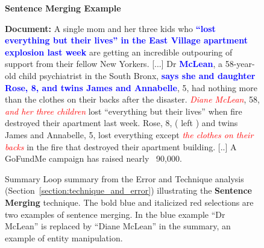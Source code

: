\documentclass[11pt,a4paper]{article}
\begin{document}
\begin{figure*}[!htbp]
    \begin{framed}
        \begin{center}
            \large
            \textbf{Sentence Merging Example}
        \end{center}
        
        \textbf{Document:} 
        A single mom and her three kids who \textbf{\textcolor{blue}{``lost everything but their lives'' in the East Village apartment explosion last week}} are getting an incredible outpouring of support from their fellow New Yorkers. [...] Dr \textbf{\textcolor{blue}{McLean}}, a 58-year-old child psychiatrist in the South Bronx, \textbf{\textcolor{blue}{says she and daughter Rose, 8, and twins James and Annabelle}}, 5, had nothing more than the clothes on their backs after the disaster. \textit{\textcolor{red}{Diane McLean}}, 58, \textit{\textcolor{red}{and her three children}} lost ``everything but their lives'' when fire destroyed their apartment last week. Rose, 8, ( left ) and twins James and Annabelle, 5, lost everything except \textit{\textcolor{red}{the clothes on their backs}} in the fire that destroyed their apartment building. [..] A GoFundMe campaign has raised nearly \ 90,000. 
    \end{framed}

    \caption{Summary Loop summary from the Error and Technique analysis (Section~\ref{section:technique_and_error}) illustrating the \textbf{Sentence Merging} technique. The bold blue and italicized red selections are two examples of sentence merging. In the blue example ``Dr McLean'' is replaced by ``Diane McLean'' in the summary, an example of entity manipulation.}    \label{fig:extra_examples2}
\end{figure*}
\end{document}
